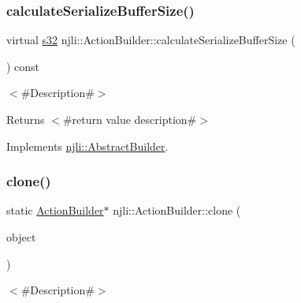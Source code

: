 \mbox{\label{classnjli_1_1_action_builder_a463dfb3486b50ee4b3ae234deafd9ad2}} 
\subsubsection{\texorpdfstring{calculate\+Serialize\+Buffer\+Size()}{calculateSerializeBufferSize()}}
{\footnotesize\ttfamily virtual \mbox{\hyperlink{_util_8h_aa62c75d314a0d1f37f79c4b73b2292e2}{s32}} njli\+::\+Action\+Builder\+::calculate\+Serialize\+Buffer\+Size (\begin{DoxyParamCaption}{ }\end{DoxyParamCaption}) const\hspace{0.3cm}{\ttfamily [virtual]}}

$<$\#\+Description\#$>$

\begin{DoxyReturn}{Returns}
$<$\#return value description\#$>$ 
\end{DoxyReturn}


Implements \mbox{\hyperlink{classnjli_1_1_abstract_builder_aa1d220053e182c37b31b427499c6eacf}{njli\+::\+Abstract\+Builder}}.

\mbox{\label{classnjli_1_1_action_builder_aa04be710105bbb879fccf8b5f950519a}} 
\subsubsection{\texorpdfstring{clone()}{clone()}}
{\footnotesize\ttfamily static \mbox{\hyperlink{classnjli_1_1_action_builder}{Action\+Builder}}$\ast$ njli\+::\+Action\+Builder\+::clone (\begin{DoxyParamCaption}\item[{const \mbox{\hyperlink{classnjli_1_1_action_builder}{Action\+Builder}} \&}]{object }\end{DoxyParamCaption})\hspace{0.3cm}{\ttfamily [static]}}

$<$\#\+Description\#$>$


